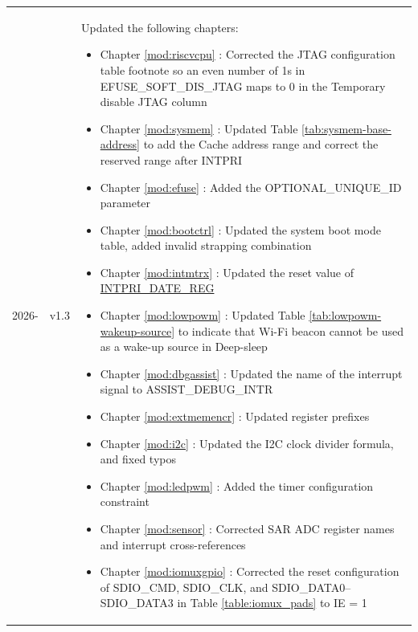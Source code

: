 \begin{longtable}[l]{ | m{2cm} | m{1.5cm} | m{12cm} | }
    2026- & v1.3 &
    Updated the following chapters:
    \begin{itemize}
        \item Chapter \ref{mod:riscvcpu} \textit{\nameref{mod:riscvcpu}}: Corrected the JTAG configuration table footnote so an even number of 1s in EFUSE\_SOFT\_DIS\_JTAG maps to 0 in the Temporary disable JTAG column
        \item Chapter \ref{mod:sysmem} \textit{\nameref{mod:sysmem}}: Updated Table \ref{tab:sysmem-base-address} to add the Cache address range and correct the reserved range after INTPRI %
        \item Chapter \ref{mod:efuse} \textit{\nameref{mod:efuse}}: Added the OPTIONAL\_UNIQUE\_ID parameter %
        \item Chapter \ref{mod:bootctrl} \textit{\nameref{mod:bootctrl}}: Updated the system boot mode table, added invalid strapping combination %
        \item Chapter \ref{mod:intmtrx} \textit{\nameref{mod:intmtrx}}: Updated the reset value of \hyperref[regdesc:INTPRIDATEREG]{INTPRI\_DATE\_REG} %
        \item Chapter \ref{mod:lowpowm} \textit{\nameref{mod:lowpowm}}: Updated Table \ref{tab:lowpowm-wakeup-source} to indicate that Wi-Fi beacon cannot be used as a wake-up source in Deep-sleep %
        \item Chapter \ref{mod:dbgassist} \textit{\nameref{mod:dbgassist}}: Updated the name of the interrupt signal to ASSIST\_DEBUG\_INTR %
        \item Chapter \ref{mod:extmemencr} \textit{\nameref{mod:extmemencr}}: Updated register prefixes
        \item Chapter \ref{mod:i2c} \textit{\nameref{mod:i2c}}: Updated the I2C clock divider formula, and fixed typos %
        \item Chapter \ref{mod:ledpwm} \textit{\nameref{mod:ledpwm}}: Added the timer configuration constraint %
        \item Chapter \ref{mod:sensor} \textit{\nameref{mod:sensor}}: Corrected SAR ADC register names and interrupt cross-references %
        \item Chapter \ref{mod:iomuxgpio} \textit{\nameref{mod:iomuxgpio}}: Corrected the reset configuration of SDIO\_CMD, SDIO\_CLK, and SDIO\_DATA0--SDIO\_DATA3 in Table \ref{table:iomux_pads} to IE = 1
    \end{itemize}

\end{longtable}
